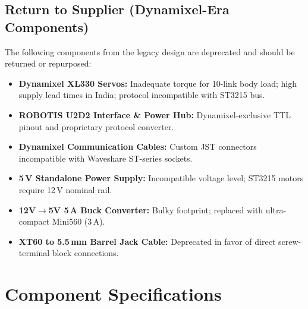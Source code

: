 \documentclass[11pt,a4paper]{article}
\begin{document}
\subsection{Return to Supplier (Dynamixel-Era Components)}
The following components from the legacy design are deprecated and should be returned or repurposed:
\begin{itemize}[leftmargin=1.5em, itemsep=0.25em]
    \item \textbf{Dynamixel XL330 Servos:} Inadequate torque for 10-link body load; high supply lead times in India; protocol incompatible with ST3215 bus.
    \item \textbf{ROBOTIS U2D2 Interface \& Power Hub:} Dynamixel-exclusive TTL pinout and proprietary protocol converter.
    \item \textbf{Dynamixel Communication Cables:} Custom JST connectors incompatible with Waveshare ST-series sockets.
    \item \textbf{5\,V Standalone Power Supply:} Incompatible voltage level; ST3215 motors require 12\,V nominal rail.
    \item \textbf{12V$\to$5V 5\,A Buck Converter:} Bulky footprint; replaced with ultra-compact Mini560 (3\,A).
    \item \textbf{XT60 to 5.5\,mm Barrel Jack Cable:} Deprecated in favor of direct screw-terminal block connections.
\end{itemize}

\section{Component Specifications}
\end{document}
